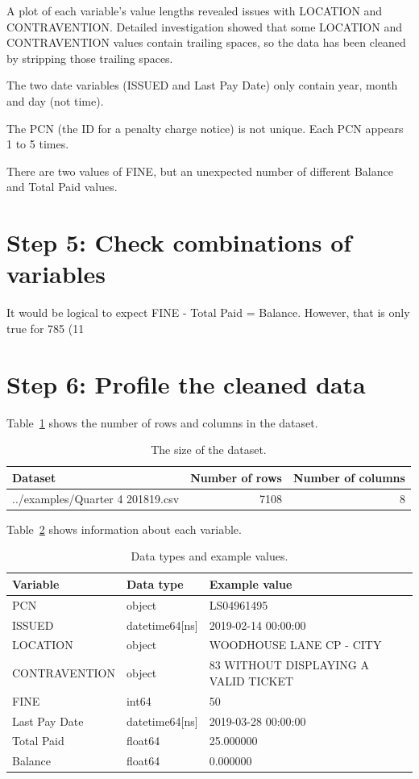 \documentclass[12pt]{article}
\begin{document}
A plot of each variable's value lengths revealed issues with LOCATION and CONTRAVENTION. Detailed investigation showed that some LOCATION and CONTRAVENTION values contain trailing spaces, so the data has been cleaned by stripping those trailing spaces.

The two date variables (ISSUED and Last Pay Date) only contain year, month and day (not time).

The PCN (the ID for a penalty charge notice) is not unique. Each PCN appears 1 to 5 times.

There are two values of FINE, but an unexpected number of different Balance and Total Paid values.

\section{Step 5: Check combinations of variables}

It would be logical to expect FINE - Total Paid = Balance. However, that is only true for 785 (11%

\section{Step 6: Profile the cleaned data}

Table~\ref{tab:1} shows the number of rows and columns in the dataset.

\begin{table}[h!]
\caption{The size of the dataset.}
\label{tab:1}
\begin{tabular}{lrr}
\toprule
Dataset & Number of rows & Number of columns \\
\midrule
../examples/Quarter 4 201819.csv & 7108 & 8 \\
\bottomrule
\end{tabular}
\end{table}

Table~\ref{tab:2} shows information about each variable.

\begin{table}[h!]
\caption{Data types and example values.}
\label{tab:2}
\begin{tabular}{lll}
\toprule
Variable & Data type & Example value \\
\midrule
PCN & object & LS04961495 \\
ISSUED & datetime64[ns] & 2019-02-14 00:00:00 \\
LOCATION & object & WOODHOUSE LANE  CP - CITY \\
CONTRAVENTION & object & 83 WITHOUT DISPLAYING A VALID TICKET \\
FINE & int64 & 50 \\
Last Pay Date & datetime64[ns] & 2019-03-28 00:00:00 \\
Total Paid & float64 & 25.000000 \\
Balance & float64 & 0.000000 \\
\bottomrule
\end{tabular}
\end{table}
\end{document}
